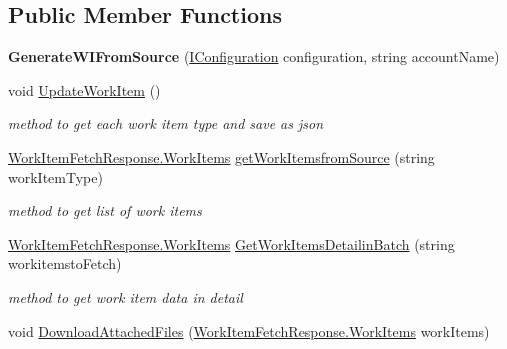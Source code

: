 \subsection*{Public Member Functions}
\begin{DoxyCompactItemize}
\item 
\mbox{\label{class_templates_generator_tool_1_1_generators_1_1_generate_w_i_from_source_ae7a1ea93683e3ad3993b7260fde411f9}} 
{\bfseries Generate\+W\+I\+From\+Source} (\mbox{\hyperlink{interface_templates_generator_tool_1_1_i_configuration}{I\+Configuration}} configuration, string account\+Name)
\item 
void \mbox{\hyperlink{class_templates_generator_tool_1_1_generators_1_1_generate_w_i_from_source_afb867463d207db51a8653f14e809e392}{Update\+Work\+Item}} ()
\begin{DoxyCompactList}\small\item\em method to get each work item type and save as json \end{DoxyCompactList}\item 
\mbox{\hyperlink{class_templates_generator_tool_1_1_view_model_1_1_work_item_fetch_response_1_1_work_items}{Work\+Item\+Fetch\+Response.\+Work\+Items}} \mbox{\hyperlink{class_templates_generator_tool_1_1_generators_1_1_generate_w_i_from_source_a99040ad4f9108c0ca4d1b9ab8edbdc62}{get\+Work\+Itemsfrom\+Source}} (string work\+Item\+Type)
\begin{DoxyCompactList}\small\item\em method to get list of work items \end{DoxyCompactList}\item 
\mbox{\hyperlink{class_templates_generator_tool_1_1_view_model_1_1_work_item_fetch_response_1_1_work_items}{Work\+Item\+Fetch\+Response.\+Work\+Items}} \mbox{\hyperlink{class_templates_generator_tool_1_1_generators_1_1_generate_w_i_from_source_a8471c5b52c936c6887720f60cd56c537}{Get\+Work\+Items\+Detailin\+Batch}} (string workitemsto\+Fetch)
\begin{DoxyCompactList}\small\item\em method to get work item data in detail \end{DoxyCompactList}\item 
void \mbox{\hyperlink{class_templates_generator_tool_1_1_generators_1_1_generate_w_i_from_source_a20c36bbbe10bb56f7f0472e8dd05b8bf}{Download\+Attached\+Files}} (\mbox{\hyperlink{class_templates_generator_tool_1_1_view_model_1_1_work_item_fetch_response_1_1_work_items}{Work\+Item\+Fetch\+Response.\+Work\+Items}} work\+Items)

\end{DoxyCompactItemize}
